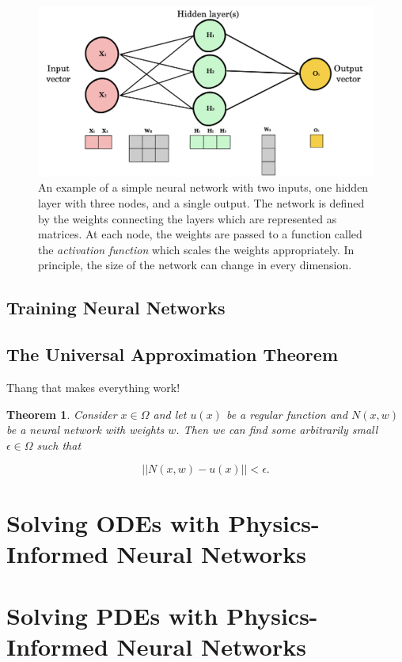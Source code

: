 \documentclass{CUP-JNL-DTM}%
\newtheorem{theorem}{Theorem}[section]
\theoremstyle{definition}
\numberwithin{equation}{section}
\begin{document}
\begin{figure}
\centering
\includegraphics[width=0.7\linewidth]{figures/NN_example.png}
\caption{An example of a simple neural network with two inputs, one hidden layer with three nodes, and a single output. The network is defined by the weights connecting the layers which are represented as matrices. At each node, the weights are passed to a function called the \emph{activation function} which scales the weights appropriately. In principle, the size of the network can change in every dimension. }
\label{fig:NNexample}
\end{figure}

\subsection{Training Neural Networks}

\subsection{The Universal Approximation Theorem}

Thang that makes everything work!

\begin{theorem}

Consider $x \in \Omega$ and let $u(x)$ be a regular function and $N(x,w)$ be a neural network with weights $w$. Then we can find some arbitrarily small $\epsilon \in \Omega$ such that 

\begin{equation}
	||N(x,w) - u(x)|| < \epsilon. 
\end{equation}

\end{theorem}

\section{Solving ODEs with Physics-Informed Neural Networks}

\section{Solving PDEs with Physics-Informed Neural Networks}
\end{document}
